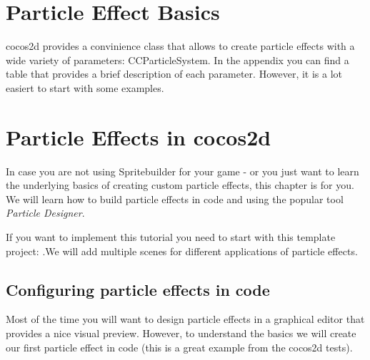 \documentclass{scrreprt}
\newcommand{\cocos}{cocos2d}
\begin{document}
\section{Particle Effect Basics}
\cocos{} provides a convinience class that allows to create particle effects
with a wide variety of parameters: CCParticleSystem.
In the appendix you can find a table that provides a brief description of each
parameter. However, it is a lot easiert to start with some examples.
\section{Particle Effects in \cocos{}}
In case you are not using Spritebuilder for your game - or you just want to
learn the underlying basics of creating custom particle effects, this chapter is
for you. We will learn how to build particle effects in code and using the
popular tool \textit{Particle Designer}.
\begin{lamp}[frametitle={Following this tutorial}]
If you want to implement this tutorial you need to start with this template
project: .We will add multiple scenes for different applications of particle
effects.
\end{lamp}
\subsection{Configuring particle effects in code}
Most of the time you will want to design particle effects in a graphical editor
that provides a nice visual preview. However, to understand the basics we will
create our first particle effect in code (this is a great example from 
the cocos2d tests).
\end{document}
